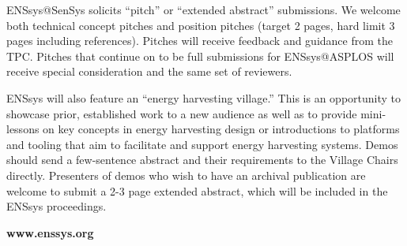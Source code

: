 \documentclass[a4paper,10pt]{scrartcl}
\begin{document}
ENSsys@SenSys solicits ``pitch'' or ``extended abstract'' submissions.
We welcome both technical concept pitches and position pitches (target 2 pages, hard limit 3 pages including references).
%
Pitches will receive feedback and guidance from the TPC.
%
Pitches that continue on to be full submissions for ENSsys@ASPLOS will receive
special consideration and the same set of reviewers.
%

\smallskip

ENSsys will also feature an ``energy harvesting village.''
%
This is an opportunity to showcase prior, established work to a new audience
as well as to provide mini-lessons on key concepts in energy harvesting design
or introductions to platforms and tooling that aim to facilitate and support
energy harvesting systems.
%
Demos should send a few-sentence abstract and their requirements to the Village Chairs directly.
%
Presenters of demos who wish to have an archival publication are welcome to submit a 2-3 page extended abstract, which will be included in the ENSsys proceedings.

\begin{center}
  \Huge\bfseries\textcolor{cfp_darkcolor}{www.enssys.org}
\end{center}

\end{document}
